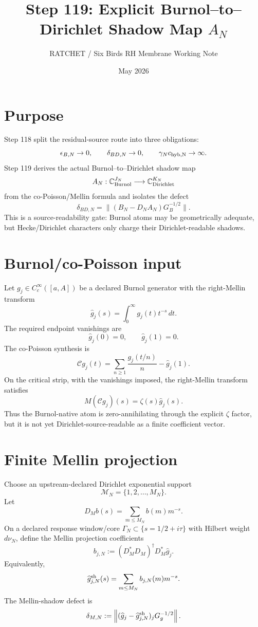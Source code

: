 \documentclass[11pt]{article}
\title{Step 119: Explicit Burnol--to--Dirichlet Shadow Map $A_N$}
\author{RATCHET / Six Birds RH Membrane Working Note}
\date{May 2026}
\begin{document}
\maketitle

\section{Purpose}
Step 118 split the residual-source route into three obligations:
\[
  \epsilon_{B,N}\to 0,\qquad \delta_{BD,N}\to 0,\qquad
  \gamma_N c_{\rm hyb,N}\to\infty.
\]
Step 119 derives the actual Burnol--to--Dirichlet shadow map
\[
  A_N : \mathbb C^{J_N}_{\rm Burnol}\longrightarrow \mathbb C^{K_N}_{\rm Dirichlet}
\]
from the co-Poisson/Mellin formula and isolates the defect
\[
  \delta_{BD,N}=\|(B_N-D_NA_N)G_B^{-1/2}\|.
\]
This is a source-readability gate: Burnol atoms may be geometrically adequate, but Hecke/Dirichlet characters only charge their Dirichlet-readable shadows.

\section{Burnol/co-Poisson input}
Let $g_j\in C_c^\infty([a,A])$ be a declared Burnol generator with the right-Mellin transform
\[
  \widehat g_j(s)=\int_0^\infty g_j(t)t^{-s}\,dt.
\]
The required endpoint vanishings are
\[
  \widehat g_j(0)=0,\qquad \widehat g_j(1)=0.
\]
The co-Poisson synthesis is
\[
  \mathcal Cg_j(t)=\sum_{n\ge1}\frac{g_j(t/n)}{n}-\widehat g_j(1).
\]
On the critical strip, with the vanishings imposed, the right-Mellin transform satisfies
\[
  M(\mathcal Cg_j)(s)=\zeta(s)\widehat g_j(s).
\]
Thus the Burnol-native atom is zero-annihilating through the explicit $\zeta$ factor, but it is not yet Dirichlet-source-readable as a finite coefficient vector.

\section{Finite Mellin projection}
Choose an upstream-declared Dirichlet exponential support
\[
  \mathcal M_N=\{1,2,\dots,M_N\}.
\]
Let
\[
  D_M b(s)=\sum_{m\le M_N}b(m)m^{-s}.
\]
On a declared response window/core $\Gamma_N\subset\{s=1/2+i\tau\}$ with Hilbert weight $d\nu_N$, define the Mellin projection coefficients
\[
  b_{j,N}:=(D_M^*D_M)^{\dagger}D_M^*\widehat g_j.
\]
Equivalently,
\[
  \widehat g_{j,N}^{\rm sh}(s)=\sum_{m\le M_N}b_{j,N}(m)m^{-s}.
\]
The Mellin-shadow defect is
\[
  \delta_{M,N}:=
  \left\| (\widehat g_j-\widehat g^{\rm sh}_{j,N})_jG_g^{-1/2}\right\|.
\]
\end{document}
